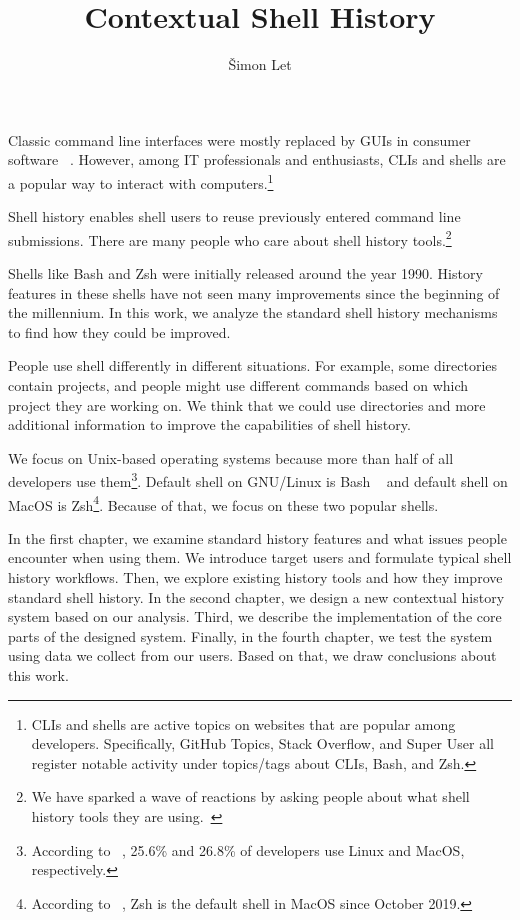 \documentclass[thesis=M,english]{FITthesis}[2012/10/20]
\title{Contextual Shell History}
\author{Šimon Let} %
\let\myCite\cite
\renewcommand\cite{\unskip~\myCite}
\begin{document}
\begin{introduction}

Classic command line interfaces were mostly replaced by GUIs in consumer software \cite{norman2007ui}. However, among IT professionals and enthusiasts, CLIs and shells are a popular way to interact with computers.\footnote{CLIs and shells are active topics on websites that are popular among developers. Specifically, GitHub Topics, Stack Overflow, and Super User all register notable activity under topics/tags about CLIs, Bash, and Zsh.} 

Shell history enables shell users to reuse previously entered command line submissions.
There are many people who care about shell history tools.\footnote{We have sparked a wave of reactions by asking people about what shell history tools they are using.\cite{twitter-thread}}

Shells like Bash and Zsh were initially released around the year 1990. History features in these shells have not seen many improvements since the beginning of the millennium. In this work, we analyze the standard shell history mechanisms to find how they could be improved.

People use shell differently in different situations. For example, some directories contain projects, and people might use different commands based on which project they are working on. We think that we could use directories and more additional information to improve the capabilities of shell history. 

We focus on Unix-based operating systems because more than half of all developers use them\footnote{According to \cite{stackoverflow2019devsurvey}, 25.6\% and 26.8\% of developers use Linux and MacOS, respectively.}. 
Default shell on GNU/Linux is Bash \cite{ramey1994gnubash} and default shell on MacOS is Zsh\footnote{According to \cite{apple2019zsh}, Zsh is the default shell in MacOS since October 2019.}. Because of that, we focus on these two popular shells.


In the first chapter, we examine standard history features and what issues people encounter when using them. We introduce target users and formulate typical shell history workflows. Then, we explore existing history tools and how they improve standard shell history. In the second chapter, we design a new contextual history system based on our analysis. Third, we describe the implementation of the core parts of the designed system. Finally, in the fourth chapter, we test the system using data we collect from our users. Based on that, we draw conclusions about this work.


\end{introduction}
\end{document}
